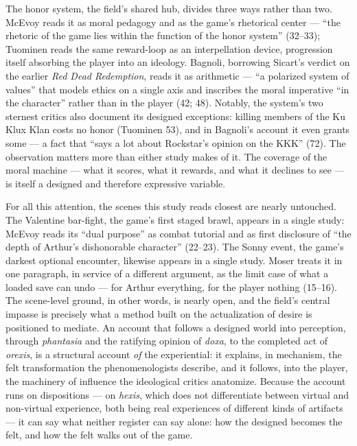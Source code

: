 \documentclass{article}
\begin{document}
The honor system, the field's shared hub, divides three ways rather than two. McEvoy reads it as moral pedagogy and as the game's rhetorical center --- ``the rhetoric of the game lies within the function of the honor system'' (32--33); Tuominen reads the same reward-loop as an interpellation device, progression itself absorbing the player into an ideology. Bagnoli, borrowing Sicart's verdict on the earlier \textit{Red Dead Redemption}, reads it as arithmetic --- ``a polarized system of values'' that models ethics on a single axis and inscribes the moral imperative ``in the character'' rather than in the player (42; 48).
Notably, the system's two sternest critics also document its designed exceptions: killing members of the Ku Klux Klan costs no honor (Tuominen 53), and in Bagnoli's account it even grants some --- a fact that ``says a lot about Rockstar's opinion on the KKK'' (72). The observation matters more than either study makes of it. The coverage of the moral machine --- what it scores, what it rewards, and what it declines to see --- is itself a designed and therefore expressive variable.

For all this attention, the scenes this study reads closest are nearly untouched. The Valentine bar-fight, the game's first staged brawl, appears in a single study: McEvoy reads its ``dual purpose'' as combat tutorial and as first disclosure of ``the depth of Arthur's dishonorable character'' (22--23). The Sonny event, the game's darkest optional encounter, likewise appears in a single study. Moser treats it in one paragraph, in service of a different argument, as the limit case of what a loaded save can undo --- for Arthur everything, for the player nothing (15--16).
The scene-level ground, in other words, is nearly open, and the field's central impasse is precisely what a method built on the actualization of desire is positioned to mediate. An account that follows a designed world into perception, through \textit{phantasia} and the ratifying opinion of \textit{doxa}, to the completed act of \textit{orexis}, is a structural account \textit{of} the experiential: it explains, in mechanism, the felt transformation the phenomenologists describe, and it follows, into the player, the machinery of influence the ideological critics anatomize. Because the account runs on dispositions --- on \textit{hexis}, which does not differentiate between virtual and non-virtual experience, both being real experiences of different kinds of artifacts --- it can say what neither register can say alone: how the designed becomes the felt, and how the felt walks out of the game.
\end{document}
